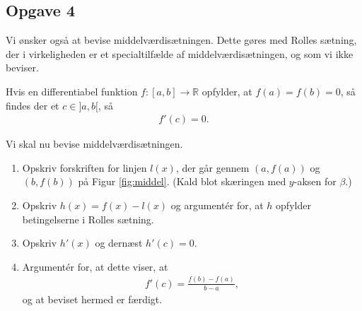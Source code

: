 \subsection*{Opgave 4}
	Vi ønsker også at bevise middelværdisætningen. Dette gøres med Rolles sætning, der i virkeligheden er et specialtilfælde af middelværdisætningen, og som vi ikke beviser. 
	\begin{setn}
		Hvis en differentiabel funktion $f: [a,b] \to \mathbb{R}$ opfylder, at $f(a) = f(b) = 0$, så findes der et 
		$c \in ]a,b[$, så
		\begin{align*}
				f'(c) = 0.
		\end{align*}
	\end{setn}
	Vi skal nu bevise middelværdisætningen. 
	\begin{enumerate}[label=\roman*)]
		\item Opskriv forskriften for linjen $l(x)$, der går gennem $(a,f(a))$ og $(b,f(b))$ på Figur \ref{fig:middel}. (Kald blot skæringen med $y$-aksen for $\beta$.)
		\item Opskriv $h(x) = f(x) - l(x)$ og argumentér for, at $h$ opfylder betingelserne i Rolles sætning. 
		\item Opskriv $h'(x)$ og dernæst $h'(c) = 0$.
		\item Argumentér for, at dette viser, at 
		\begin{align*}
			f'(c) = \frac{f(b) - f(a)}{b - a},
		\end{align*}
		og at beviset hermed er færdigt. 
	\end{enumerate}